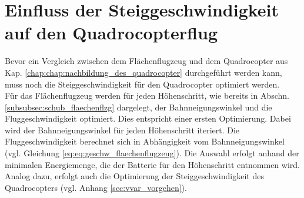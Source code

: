 \section{Einfluss der Steiggeschwindigkeit auf den Quadrocopterflug}
Bevor ein Vergleich zwischen dem Flächenflugzeug und dem Quadrocopter aus Kap. \ref{chap:chap:nachbildung_des_quadrocopter} durchgeführt werden kann, muss noch die Steiggeschwindigkeit für den Quadrocopter optimiert werden. \\
Für das Flächenflugzeug werden für jeden Höhenschritt, wie bereits in Abschn. \ref{subsubsec:schub_flaechenflzg} dargelegt, der Bahnneigungswinkel und die Fluggeschwindigkeit optimiert. Dies entspricht einer ersten Optimierung. Dabei wird der Bahnneigungswinkel für jeden Höhenschritt iteriert. Die Fluggeschwindigkeit berechnet sich in Abhängigkeit vom Bahnneigungswinkel (vgl. Gleichung \eqref{eq:eq:geschw_flaechenflugzeug}). Die Auswahl erfolgt anhand der minimalen Energiemenge, die der Batterie für den Höhenschritt entnommen wird. Analog dazu, erfolgt auch die Optimierung der Steiggeschwindigkeit des Quadrocopters (vgl. Anhang \ref{sec:vvar_vorgehen}). \\
